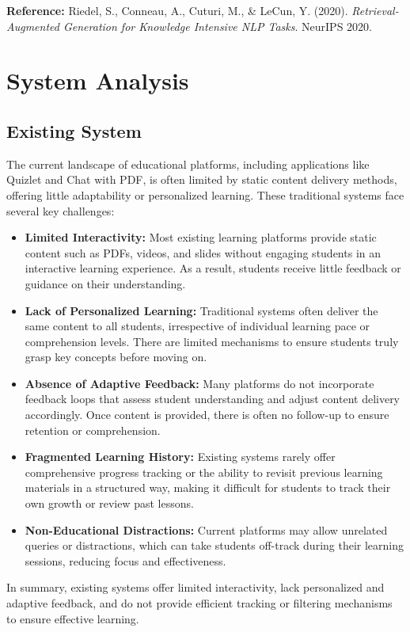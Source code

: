 \documentclass{report}
\begin{document}
\textbf{Reference:} Riedel, S., Conneau, A., Cuturi, M., \& LeCun, Y. (2020). \textit{Retrieval-Augmented Generation for Knowledge Intensive NLP Tasks}. NeurIPS 2020.




\chapter{System Analysis}

\section{Existing System}
The current landscape of educational platforms, including applications like Quizlet and Chat with PDF, is often limited by static content delivery methods, offering little adaptability or personalized learning. These traditional systems face several key challenges:
\begin{itemize}
    \item \textbf{Limited Interactivity:} Most existing learning platforms provide static content such as PDFs, videos, and slides without engaging students in an interactive learning experience. As a result, students receive little feedback or guidance on their understanding.
    \item \textbf{Lack of Personalized Learning:} Traditional systems often deliver the same content to all students, irrespective of individual learning pace or comprehension levels. There are limited mechanisms to ensure students truly grasp key concepts before moving on.
    \item \textbf{Absence of Adaptive Feedback:} Many platforms do not incorporate feedback loops that assess student understanding and adjust content delivery accordingly. Once content is provided, there is often no follow-up to ensure retention or comprehension.
    \item \textbf{Fragmented Learning History:} Existing systems rarely offer comprehensive progress tracking or the ability to revisit previous learning materials in a structured way, making it difficult for students to track their own growth or review past lessons.
    \item \textbf{Non-Educational Distractions:} Current platforms may allow unrelated queries or distractions, which can take students off-track during their learning sessions, reducing focus and effectiveness.
\end{itemize}
In summary, existing systems offer limited interactivity, lack personalized and adaptive feedback, and do not provide efficient tracking or filtering mechanisms to ensure effective learning.
\end{document}

